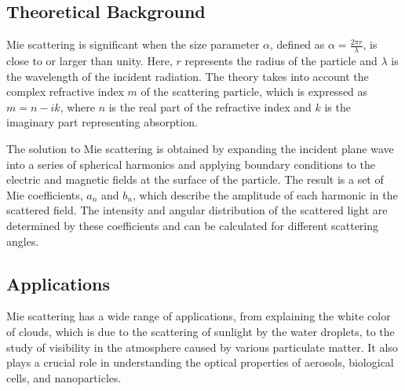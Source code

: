 \documentclass[10pt,letterpaper,onecolumn]{article}
\begin{document}
\subsection{Theoretical Background}

Mie scattering is significant when the size parameter \( \alpha \), defined as \( \alpha = \frac{2\pi r}{\lambda} \), is close to or larger than unity. Here, \( r \) represents the radius of the particle and \( \lambda \) is the wavelength of the incident radiation. The theory takes into account the complex refractive index \( m \) of the scattering particle, which is expressed as \( m = n - ik \), where \( n \) is the real part of the refractive index and \( k \) is the imaginary part representing absorption.

The solution to Mie scattering is obtained by expanding the incident plane wave into a series of spherical harmonics and applying boundary conditions to the electric and magnetic fields at the surface of the particle. The result is a set of Mie coefficients, \( a_n \) and \( b_n \), which describe the amplitude of each harmonic in the scattered field. The intensity and angular distribution of the scattered light are determined by these coefficients and can be calculated for different scattering angles.

\subsection{Applications}

Mie scattering has a wide range of applications, from explaining the white color of clouds, which is due to the scattering of sunlight by the water droplets, to the study of visibility in the atmosphere caused by various particulate matter. It also plays a crucial role in understanding the optical properties of aerosols, biological cells, and nanoparticles.
\end{document}
